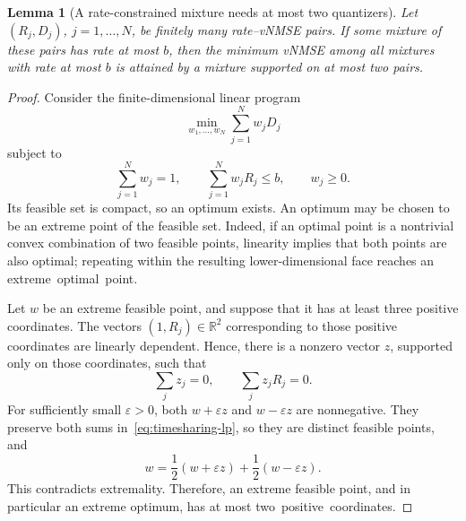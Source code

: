 \documentclass[11pt,letterpaper]{article}
\newtheorem{lemma}{Lemma}
\begin{document}
{\begin{lemma}[A rate-constrained mixture needs at most two quantizers]
\label{lem:timesharing-two-quantizers-suffice}
Let $(R_j,D_j)$, $j=1,\ldots,N$, be finitely many rate--vNMSE pairs. If some
mixture of these pairs has rate at most $b$, then the minimum vNMSE among all
mixtures with rate at most $b$ is attained by a mixture supported on at most two pairs.
\end{lemma}

\begin{proof}
Consider the finite-dimensional linear program
\[
\min_{w_1,\ldots,w_N}\sum_{j=1}^N w_jD_j
\]
subject to
\begin{equation}
\sum_{j=1}^N w_j=1,
\qquad
\sum_{j=1}^N w_jR_j\le b,
\qquad
w_j\ge0.
\label{eq:timesharing-lp}
\end{equation}
Its feasible set is compact, so an optimum exists. An optimum may be chosen
to be an extreme point of the feasible set. Indeed, if an optimal point is a
nontrivial convex combination of two feasible points, linearity implies that
both points are also optimal; repeating within the resulting
lower-dimensional face reaches an \mbox{extreme optimal point.}

Let $w$ be an extreme feasible point, and suppose that it has at least three
positive coordinates. The vectors $(1,R_j)\in\mathbb{R}^2$ corresponding to
those positive coordinates are linearly dependent. Hence, there is a nonzero
vector $z$, supported only on those coordinates, such that
\[
\sum_jz_j=0,
\qquad
\sum_jz_jR_j=0.
\]
For sufficiently small $\varepsilon>0$, both $w+\varepsilon z$ and
$w-\varepsilon z$ are nonnegative. They preserve both sums
in~\eqref{eq:timesharing-lp}, so they are distinct feasible points, and
\[
w=\frac12(w+\varepsilon z)+\frac12(w-\varepsilon z).
\]
This contradicts extremality. Therefore, an extreme feasible point, and in
particular an extreme optimum, has at most \mbox{two positive coordinates.}
\end{proof}


}
\end{document}
